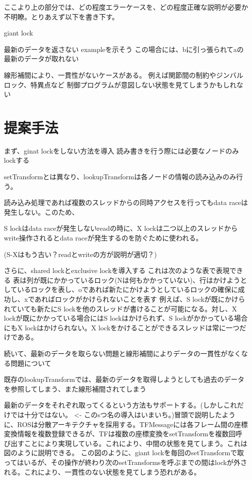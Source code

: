 \documentclass{jarticle}
\begin{document}
\begin{multicols}{2}
ここより上の部分では、どの程度エラーケースを、どの程度正確な説明が必要か不明瞭。とりあえず以下を書き下す。

giant lock

最新のデータを返さない
exampleを示そう
%
この場合には、bに引っ張られてaの最新のデータが取れない

線形補間により、一貫性がないケースがある。
例えば関節間の制約やジンバルロック、特異点など
制御プログラムが意図しない状態を見てしまうかもしれない

\section{提案手法}

まず、ginat lockをしない方法を導入
読み書きを行う際には必要なノードのみlockする

setTransformとは異なり、lookupTransformは各ノードの情報の読み込みのみ行う。

読み込み処理であれば複数のスレッドからの同時アクセスを行ってもdata raceは発生しない。このため、


S lockはdata raceが発生しないreadの時に、X lockは二つ以上のスレッドからwrite操作されるとdata raceが発生するのを防ぐために使われる。

(S-Xはもう古い？readとwriteの方が説明が適切？)


さらに、shared lockとexclusive lockを導入する
これは次のような表で表現できる
%
表は列が既にかかっているロック(Nは何もかかっていない)、行はかけようとしているロックを表し、oであれば新たにかけようとしているロックの確保に成功し、xであればロックがかけられないことを表す
例えば、S lockが既にかけられていても新たにS lockを他のスレッドが書けることが可能になる。対し、X lockが既にかかっている場合にはS lockはかけられず、S lockがかかっている場合にもX lockはかけられない。X lockをかけることができるスレッドは常に一つだけである。


続いて、最新のデータを取らない問題と線形補間によりデータの一貫性がなくなる問題について

既存のlookupTransformでは、最新のデータを取得しようとしても過去のデータを参照してしまう、また線形補間されてしまう

最新のデータをそれぞれ取ってくるという方法もサポートする。(しかしこれだけでは十分ではない。 <- このsつ名の導入はいまいち。)冒頭で説明したように、ROSは分散アーキテクチャを採用する。TFMessageには各フレーム間の座標変換情報を複数登録できるが、TFは複数の座標変換をsetTransformを複数回呼び出すことにより実現している。これにより、中間の状態を見てしまう。これは図のように説明できる。
この図のように、giant lockを毎回のsetTransformで取ってはいるが、その操作が終わり次のsetTransformsを呼ぶまでの間はlockが外される。これにより、一貫性のない状態を見てしまう恐れがある。



\end{multicols}
\end{document}
